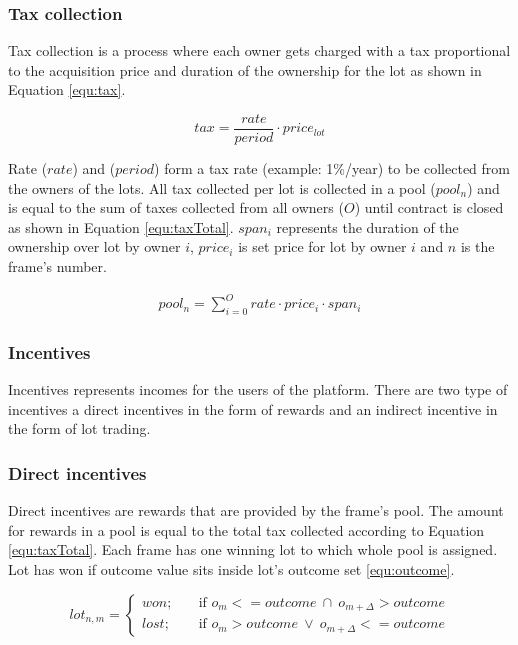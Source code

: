 \documentclass{article}
\begin{document}
	\subsubsection*{Tax collection}
	
	Tax collection is a process where each owner gets charged with a tax proportional to the acquisition price and duration of the ownership for the lot as shown in Equation \ref{equ:tax}.
	
	\begin{equation}
		tax=\frac{rate}{period}\cdot price_{lot}
		\label{equ:tax}
	\end{equation}
	
	Rate ($rate$) and ($period$) form a tax rate (example: 1\%/year) to be collected from the owners of the lots. All tax collected per lot is collected in a pool ($pool_n$) and is equal to the sum of taxes collected from all owners ($O$) until contract is closed as shown in Equation \ref{equ:taxTotal}. $span_i$ represents the duration of the ownership over lot by owner $i$, $price_i$ is set price for lot by owner $i$ and $n$ is the frame's number.
	
	\begin{gather}
		pool_n=\sum_{i=0}^{O}rate\cdot price_i \cdot span_i
		\label{equ:taxTotal}
	\end{gather}
	
	\subsubsection{Incentives}
	
	Incentives represents incomes for the users of the platform. There are two type of incentives a direct incentives in the form of rewards and an indirect incentive in the form of lot trading.  
	
	\subsubsection*{Direct incentives}
	
	Direct incentives are rewards that are provided by the frame's pool. The amount for rewards in a pool is equal to the total tax collected according to Equation \ref{equ:taxTotal}. Each frame has one winning lot to which whole pool is assigned. Lot has won if outcome value sits inside lot's outcome set \ref{equ:outcome}.
	
	\begin{equation}
		lot_{n,m} =
		\begin{cases}
			won; & \quad \text{if } o_m<=outcome\ \cap \  o_{m+\Delta}>outcome\\
			lost;  & \quad \text{if } o_m>outcome\ 	\lor \  o_{m+\Delta}<=outcome
		\end{cases}
		\label{equ:outcome}
	\end{equation}
	
\end{document}
